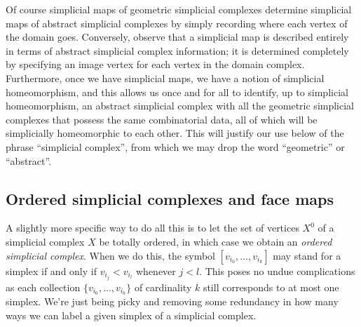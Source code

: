 \documentclass[12pt]{article}
\theoremstyle{plain}
\theoremstyle{definition}
\theoremstyle{remark}
\begin{document}
Of course simplicial maps of geometric simplicial complexes determine simplicial maps of abstract simplicial complexes by simply recording where each vertex of the domain goes. Conversely, observe that a simplicial map is described entirely in terms of abstract simplicial complex information; it is determined completely by specifying an image vertex for each vertex in the domain complex. Furthermore, once we have simplicial maps, we have a notion of simplicial homeomorphism, and this allows us once and for all to identify, up to simplicial homeomorphism, an abstract simplicial complex with all the geometric simplicial complexes that possess the same combinatorial data, all of which will be simplicially homeomorphic to each other. This will justify our use below of the phrase ``simplicial complex'', from which we may drop the word ``geometric'' or ``abstract''. 













\subsection{Ordered simplicial complexes and face maps}


A slightly more specific way to do all this is to let the set of vertices $X^0$ of a simplicial complex $X$ be totally ordered, in which case we obtain an \emph{ordered simplicial complex}. When we do this, the symbol $[v_{i_0},\ldots, v_{i_k}]$ may stand for a simplex if and only if $v_{i_j}<v_{i_{l}}$ whenever $j<l$. This poses no undue complications as each collection $\{v_{i_0},\ldots, v_{i_k}\}$ of cardinality $k$ still corresponds to at most one simplex. We're just being picky and removing some redundancy in how many ways we can label a given simplex of a simplicial complex.
\end{document}
